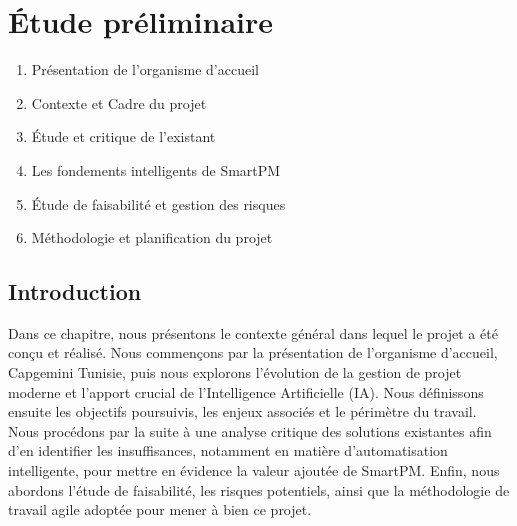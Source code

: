 \chapter{Étude préliminaire}

\vspace{-0.5cm}
\begin{tcolorbox}[colback=lightgray, colframe=primaryblue, title=\textbf{Plan du chapitre}, fonttitle=\bfseries]
  \begin{enumerate}[leftmargin=*, label=\arabic*.]
    \item Présentation de l'organisme d'accueil \dotfill \pageref{sec:organisme}
    \item Contexte et Cadre du projet \dotfill \pageref{sec:cadre}
    \item Étude et critique de l'existant \dotfill \pageref{sec:existant}
    \item Les fondements intelligents de SmartPM \dotfill \pageref{sec:piliers}
    \item Étude de faisabilité et gestion des risques \dotfill \pageref{sec:faisabilite}
    \item Méthodologie et planification du projet \dotfill \pageref{sec:methodologie}
  \end{enumerate}
\end{tcolorbox}

\section*{Introduction}

Dans ce chapitre, nous présentons le contexte général dans lequel le projet a été conçu et
réalisé. Nous commençons par la présentation de l'organisme d'accueil, Capgemini Tunisie, 
puis nous explorons l'évolution de la gestion de projet moderne et l'apport crucial de 
l'Intelligence Artificielle (IA). Nous définissons ensuite les objectifs poursuivis, les enjeux 
associés et le périmètre du travail. Nous procédons par la suite à une analyse critique des 
solutions existantes afin d'en identifier les insuffisances, notamment en matière d'automatisation intelligente,
pour mettre en évidence la valeur ajoutée de SmartPM. Enfin, nous abordons l'étude de faisabilité,
les risques potentiels, ainsi que la méthodologie de travail agile adoptée pour mener à bien ce projet.

